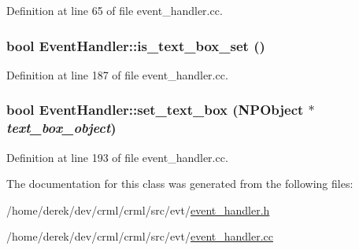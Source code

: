 Definition at line 65 of file event\_\-handler.cc.

\hypertarget{class_event_handler_a2f334e3eb39be72751e342619489e695}{
\subsubsection[{is\_\-text\_\-box\_\-set}]{\setlength{\rightskip}{0pt plus 5cm}bool EventHandler::is\_\-text\_\-box\_\-set ()}}
\label{class_event_handler_a2f334e3eb39be72751e342619489e695}


Definition at line 187 of file event\_\-handler.cc.

\hypertarget{class_event_handler_aa09c0b995aa6c774d4a33be13be0cbf2}{
\subsubsection[{set\_\-text\_\-box}]{\setlength{\rightskip}{0pt plus 5cm}bool EventHandler::set\_\-text\_\-box (NPObject $\ast$ {\em text\_\-box\_\-object})}}
\label{class_event_handler_aa09c0b995aa6c774d4a33be13be0cbf2}


Definition at line 193 of file event\_\-handler.cc.



The documentation for this class was generated from the following files:\begin{DoxyCompactItemize}
\item 
/home/derek/dev/crml/crml/src/evt/\hyperlink{event__handler_8h}{event\_\-handler.h}\item 
/home/derek/dev/crml/crml/src/evt/\hyperlink{event__handler_8cc}{event\_\-handler.cc}\end{DoxyCompactItemize}
